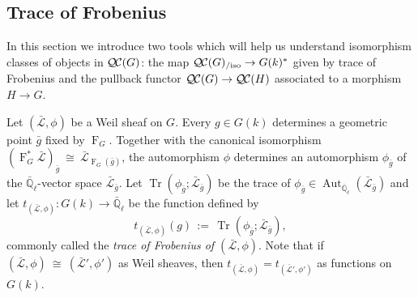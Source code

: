 \documentclass[CM,Submssn,SecEq]{degruyter-crelle} %
\theoremstyle{plain}
\theoremstyle{definition}
\theoremstyle{remark}
\newcommand{\EE}{\mathbb{\bar Q}_\ell}
\newcommand{\bFq}{\bar{k}}
\newcommand{\Fq}{k}
\newcommand{\Weil}[1]{\mathcal{W}_{#1}}
\DeclareMathOperator{\Gal}{Gal}
\newcommand{\Frob}[1]{\operatorname{F}_{#1}}
\DeclareMathOperator{\Aut}{Aut}
\DeclareMathOperator{\trace}{Tr}
\newcommand{\ceq}{{\, :=\, }}
\newcommand{\iso}{{\ \cong\ }}
\newcommand{\trFrob}[1]{t_{#1}}
\newcommand{\gqcs}[1]{{\mathcal{\bar #1}}}
\newcommand{\QC}{{\mathcal{Q\hskip-0.8pt C}}}
\newcommand{\QCiso}[1]{\QC(#1)_{/\text{iso}}}
\newcommand{\bg}{\bar{g}}
\newcommand{\bG}{\bar{G}}
\begin{document}
\subsection{Trace of Frobenius}\label{ssec:Frob}

In this section we introduce two tools which will help us understand isomorphism classes of objects in $\QC(G)$: the map $\QCiso{G} \to G(k)^*$ given by trace of Frobenius and the pullback functor $\QC(G) \to \QC(H)$ associated to a morphism $H \to G$.


%


Let $(\gqcs{L},\phi)$ be a Weil sheaf on $G$. Every $g\in G(\Fq)$
determines a geometric point $\bg$ fixed by $\Frob{G}$. 
Together with the canonical isomorphism $(\Frob{G}^*\gqcs{L})_{\bg} \iso  \gqcs{L}_{\Frob{G}(\bg)}$, the automorphism $\phi$ determines an automorphism $\phi_{\bg}$ of the $\EE$-vector space $\gqcs{L}_{\bg}$.
Let $\trace(\phi_{\bg};\gqcs{L}_{\bg})$ be the trace of $\phi_{\bg} \in \Aut_{\EE}(\gqcs{L}_{\bg})$ and let $\trFrob{(\gqcs{L},\phi)} : G(\Fq)\to \EE$ be the function defined by 
\begin{equation}\label{trWeil}
\trFrob{(\gqcs{L},\phi)}(g) \ceq \trace(\phi_{\bg};\gqcs{L}_{\bg}),
\end{equation}
commonly called the {\em trace of Frobenius of $(\gqcs{L},\phi)$}.
Note that if $(\gqcs{L},\phi) \iso (\gqcs{L'},\phi')$ as Weil sheaves, 
then $\trFrob{(\gqcs{L},\phi)} = \trFrob{(\gqcs{L'},\phi')}$ as functions on $G(\Fq)$.
\end{document}

